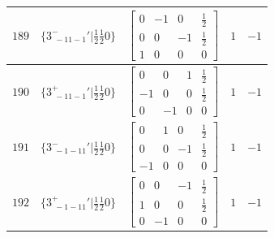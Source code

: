 \documentclass[fleqn,8pt]{jsarticle}
\begin{document}
\begin{longtable}{ccccc}
$ 189 $ & $ \{3^{-}_{\,\,-11-1}{}'|\frac{1}{2} \frac{1}{2} 0\} $ & $ \begin{bmatrix} 0 & -1 & 0 & \frac{1}{2} \\ 0 & 0 & -1 & \frac{1}{2} \\ 1 & 0 & 0 & 0 \end{bmatrix} $ & $ 1 $ & $ -1 $ \\ \hline
$ 190 $ & $ \{3^{+}_{\,\,-11-1}{}'|\frac{1}{2} \frac{1}{2} 0\} $ & $ \begin{bmatrix} 0 & 0 & 1 & \frac{1}{2} \\ -1 & 0 & 0 & \frac{1}{2} \\ 0 & -1 & 0 & 0 \end{bmatrix} $ & $ 1 $ & $ -1 $ \\ \hline
$ 191 $ & $ \{3^{-}_{\,\,-1-11}{}'|\frac{1}{2} \frac{1}{2} 0\} $ & $ \begin{bmatrix} 0 & 1 & 0 & \frac{1}{2} \\ 0 & 0 & -1 & \frac{1}{2} \\ -1 & 0 & 0 & 0 \end{bmatrix} $ & $ 1 $ & $ -1 $ \\ \hline
$ 192 $ & $ \{3^{+}_{\,\,-1-11}{}'|\frac{1}{2} \frac{1}{2} 0\} $ & $ \begin{bmatrix} 0 & 0 & -1 & \frac{1}{2} \\ 1 & 0 & 0 & \frac{1}{2} \\ 0 & -1 & 0 & 0 \end{bmatrix} $ & $ 1 $ & $ -1 $ \\
\end{longtable}
\end{document}
